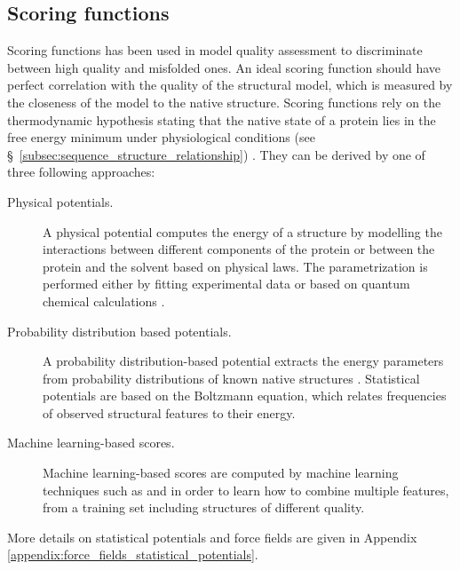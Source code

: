 \subsection{Scoring functions}
\label{subsec:scoring_functions}
Scoring functions has been used in model quality assessment to discriminate between high quality and misfolded ones. An ideal scoring function should have perfect correlation with the quality of the structural model, which is measured by the closeness of the model to the native structure. Scoring functions rely on the thermodynamic hypothesis stating that the native state of a protein lies in the free energy minimum under physiological conditions (see \S~\ref{subsec:sequence_structure_relationship}) \cite{Lazaridis2000aa}. They can be derived by one of three following approaches: 
\begin{description}
\item[Physical potentials.] A physical potential computes the energy of a structure by modelling the interactions between different components of the protein or between the protein and the solvent based on physical laws. The parametrization is performed either by fitting experimental data or based on quantum chemical calculations \cite{Fogolari2003aa, Lazaridis1999aa}.
\item[Probability distribution based potentials.] A probability dis\-tri\-bu\-tion-\-based potential extracts the energy parameters from probability distributions of known native structures \cite{Bahar1997aa, Sippl1990aa}. Statistical potentials are based on the Boltzmann equation, which relates frequencies of observed structural features to their energy.
\item[Machine learning-based scores.] Machine learning-based scores are computed by machine learning techniques such as  \cite{Mereghetti2008aa} and  \cite{Qiu2008} in order to learn how to combine multiple features, from a training set including structures of different quality. 
\end{description}
More details on statistical potentials and force fields are given in Appendix \ref{appendix:force_fields_statistical_potentials}.

